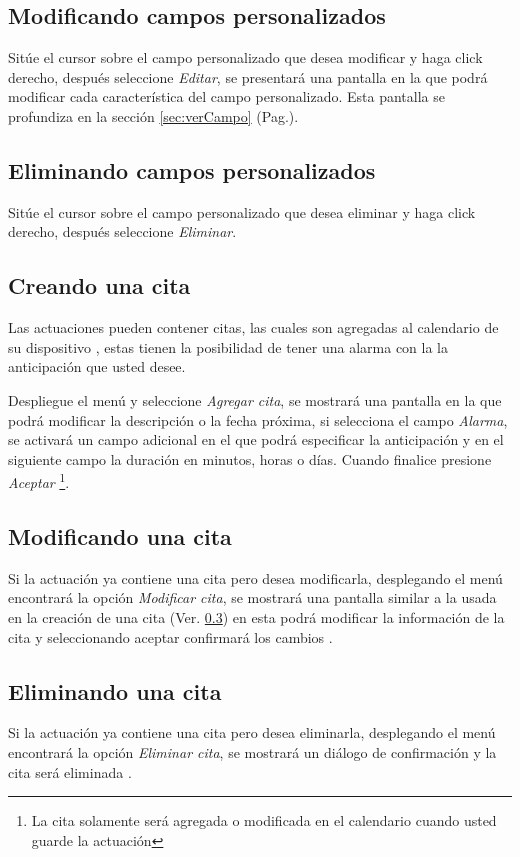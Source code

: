 \subsection{Modificando campos personalizados}
\label{sec:modificarCamposActuacion}
Sit\'ue el cursor sobre el campo personalizado que desea modificar y haga click derecho, despu\'es seleccione \emph{Editar},
se presentar\'a una pantalla en la que podr\'a modificar cada caracter\'istica
del campo personalizado. Esta pantalla se profundiza en la secci\'on
\ref{sec:verCampo} (Pag.\pageref{sec:verCampo}).

\subsection{Eliminando campos personalizados}
\label{sec:eliminarCamposActuacion}
Sit\'ue el cursor sobre el campo personalizado que desea eliminar y haga click derecho, despu\'es seleccione \emph{Eliminar}.

\subsection{Creando una cita}
\label{sec:crearCita}
Las actuaciones pueden contener citas, las cuales son agregadas al calendario
de su dispositivo \blackberry, estas tienen la posibilidad de tener una alarma
con la la anticipaci\'on que usted desee.

Despliegue el men\'u \blackberry y seleccione \emph{Agregar cita}, se mostrar\'a una
pantalla en la que podr\'a modificar la descripci\'on o la fecha pr\'oxima,
si selecciona el campo \emph{Alarma}, se activar\'a un campo adicional en el
que podr\'a especificar la anticipaci\'on y en el siguiente campo la duraci\'on
en minutos, horas o d\'ias. Cuando finalice presione \emph{Aceptar}
\footnote{La cita solamente ser\'a agregada o modificada en el calendario cuando
usted guarde la actuaci\'on}.

\subsection{Modificando una cita}
\label{sec:modificarCita}
Si la actuaci\'on ya contiene una cita pero desea modificarla, desplegando el
men\'u \blackberry encontrar\'a la opci\'on \emph{Modificar cita}, se
mostrar\'a una pantalla similar a la usada en la creaci\'on de una cita (Ver.
\ref{sec:crearCita}) en esta podr\'a modificar la informaci\'on de la cita
y seleccionando aceptar confirmar\'a los cambios
\footnotemark[\value{footnote}].

\subsection{Eliminando una cita}
\label{sec:eliminarCita}
Si la actuaci\'on ya contiene una cita pero desea eliminarla, desplegando el
men\'u \blackberry encontrar\'a la opci\'on \emph{Eliminar cita}, se mostrar\'a
un di\'alogo de confirmaci\'on y la cita ser\'a eliminada
\footnotemark[\value{footnote}].